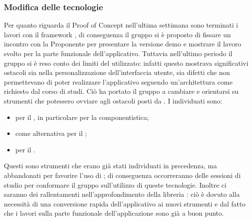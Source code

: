 \subsubsection{Modifica delle tecnologie}
\par Per quanto riguarda il Proof of Concept nell'ultima settimana sono terminati i lavori con il framework , di conseguenza il gruppo si è proposto di fissare un incontro con la Proponente per presentare la versione demo e mostrare il lavoro svolto per la parte funzionale dell'applicativo.
Tuttavia nell'ultimo periodo il gruppo si è reso conto dei limiti del  utilizzato: infatti questo mostrava significativi ostacoli sia nella personalizzazione dell'interfaccia utente, sia difetti che non permettevano di poter realizzare l'applicativo seguendo un'architettura come richiesto dal corso di studi.
Ciò ha portato il gruppo a cambiare  e orientarsi su strumenti che potessero ovviare agli ostacoli posti da . 
I  individuati sono:
\begin{itemize}
	\item {} per il , in particolare per la componentistica;
	\item {} come alternativa per il ;
	\item {} per il .
\end{itemize}
Questi sono strumenti che erano già stati individuati in precedenza, ma abbandonati per favorire l'uso di ; di conseguenza occorreranno delle sessioni di studio per conformare il gruppo sull'utilizzo di queste tecnologie. 
Inoltre ci saranno dei rallentamenti nell'approfondimento della libreria : ciò è dovuto alla necessità di una conversione rapida dell'applicativo ai nuovi strumenti e dal fatto che i lavori sulla parte funzionale dell'applicazione sono già a buon punto.

